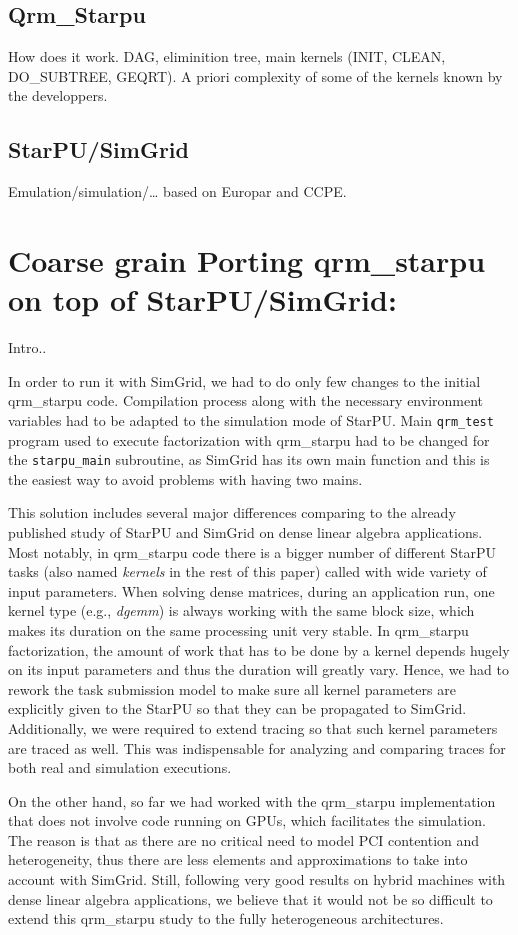 \documentclass[smallextended]{svjour3}
\begin{document}
\subsection{Qrm\_Starpu}
\label{sec-3-1}
How does it work. DAG, eliminition tree, main kernels (INIT, CLEAN,
DO\_SUBTREE, GEQRT). A priori complexity of some of the kernels known by
the developpers.
\subsection{StarPU/SimGrid}
\label{sec-3-2}
Emulation/simulation/\ldots{} based on Europar and CCPE.
\section{Coarse grain Porting qrm\_starpu on top of StarPU/SimGrid:}
\label{sec-4}

Intro..

In order to run it with SimGrid, we had to do only few changes to
the initial qrm\_starpu code. Compilation process along with the
necessary environment variables had to be adapted to the simulation
mode of StarPU. Main \texttt{qrm\_test} program used to execute factorization
with qrm\_starpu had to be changed for the \texttt{starpu\_main} subroutine,
as SimGrid has its own main function and this is the easiest way to
avoid problems with having two mains.

This solution includes several major differences comparing to the
already published study of StarPU and SimGrid on dense linear
algebra applications\cite{Stanisic_CCPE}. Most notably, in
qrm\_starpu code there is a bigger number of different StarPU tasks
(also named \emph{kernels} in the rest of this paper) called with wide
variety of input parameters. When solving dense matrices, during an
application run, one kernel type (e.g., \emph{dgemm}) is always working
with the same block size, which makes its duration on the same
processing unit very stable. In qrm\_starpu factorization, the
amount of work that has to be done by a kernel depends hugely on its
input parameters and thus the duration will greatly vary. Hence, we
had to rework the task submission model to make sure all kernel
parameters are explicitly given to the StarPU so that they can be
propagated to SimGrid. Additionally, we were required to extend
tracing so that such kernel parameters are traced as well. This was
indispensable for analyzing and comparing traces for both real and
simulation executions.

On the other hand, so far we had worked with the qrm\_starpu
implementation that does not involve code running on GPUs, which
facilitates the simulation. The reason is that as there are no
critical need to model PCI contention and heterogeneity, thus there
are less elements and approximations to take into account with
SimGrid. Still, following very good results on hybrid machines with
dense linear algebra applications, we believe that it would not be
so difficult to extend this qrm\_starpu study to the fully
heterogeneous architectures.
\end{document}
